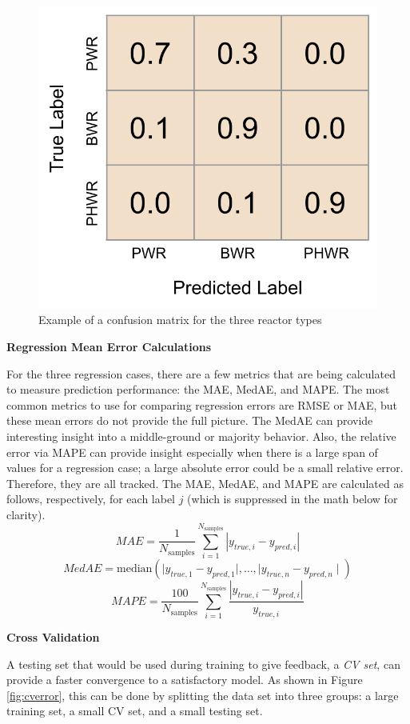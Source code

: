 \begin{figure}[!htb]
  \centering
  \includegraphics[width=0.4\linewidth]{./chapters/litrev/cm_example.png}
  \caption{Example of a confusion matrix for the three reactor types}
  \label{fig:cm_ex}
\end{figure}

\noindent \textbf{Regression Mean Error Calculations}

For the three regression cases, there are a few metrics that are being
calculated to measure prediction performance: the \gls{MAE}, \gls{MedAE}, and
\gls{MAPE}. The most common metrics to use for comparing regression errors are
\gls{RMSE} or \gls{MAE}, but these mean errors do not provide the full picture.
The \gls{MedAE} can provide interesting insight into a middle-ground or
majority behavior. Also, the relative error via \gls{MAPE} can provide insight
especially when there is a large span of values for a regression case; a large
absolute error could be a small relative error. Therefore, they are all
tracked.  The \gls{MAE}, \gls{MedAE}, and \gls{MAPE} are calculated as follows,
respectively, for each label $j$ (which is suppressed in the math below for
clarity).
\begin{equation}
  \textit{MAE} = \frac{1}{N_{\text{samples}}} \sum_{i=1}^{N_{\text{samples}}} 
                 \left| y_{true, i} - y_{pred, i} \right|
\end{equation}
\begin{equation}
  \textit{MedAE} = \text{median}(\mid y_{true, 1} - y_{pred, 1} \mid, \ldots, 
                                 \mid y_{true, n} - y_{pred, n} \mid)
\end{equation}
\begin{equation}
  \textit{MAPE} =  \frac{100}{N_{\text{samples}}} \sum_{i=1}^{N_{\text{samples}}} 
                   \frac{\left| y_{true, i} - y_{pred, i} \right|}{y_{true, i}}
\end{equation}

\noindent \textbf{Cross Validation}

A testing set that would be used during training to give feedback, a
\textit{\gls{CV} set}, can provide a faster convergence to a satisfactory
model. As shown in Figure \ref{fig:cverror}, this can be done by splitting the
data set into three groups: a large training set, a small \gls{CV} set, and a
small testing set.  

